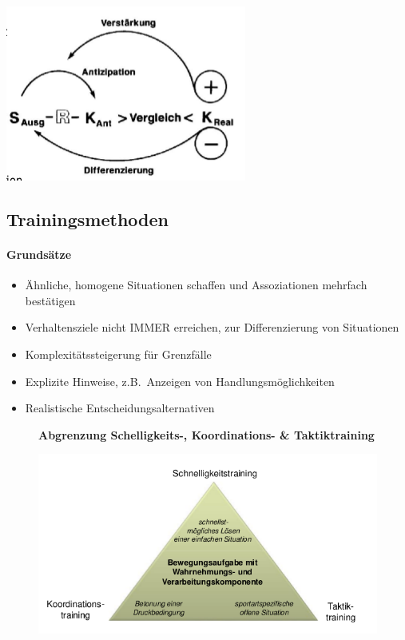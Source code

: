   \begin{minipage}{.5\textwidth}
    \includegraphics[width=\textwidth]{pictures/taktik_avk.png}
  \end{minipage}

\subsection{Trainingsmethoden}
\paragraph{Grundsätze}
\begin{itemize}
  \item Ähnliche, homogene Situationen schaffen und Assoziationen mehrfach bestätigen
  \item Verhaltensziele nicht IMMER erreichen, zur Differenzierung von Situationen
  \item Komplexitätssteigerung für Grenzfälle
  \item Explizite Hinweise, z.B.\ Anzeigen von Handlungsmöglichkeiten
  \item Realistische Entscheidungsalternativen
\end{itemize}
\begin{figure}[H]
  \begin{flushleft}
    \textbf{Abgrenzung Schelligkeits-, Koordinations- \& Taktiktraining}\\
  \end{flushleft}
  \centering
  \includegraphics[width=.7\textwidth]{pictures/taktik_training_abgrenzung.png}
\end{figure}

